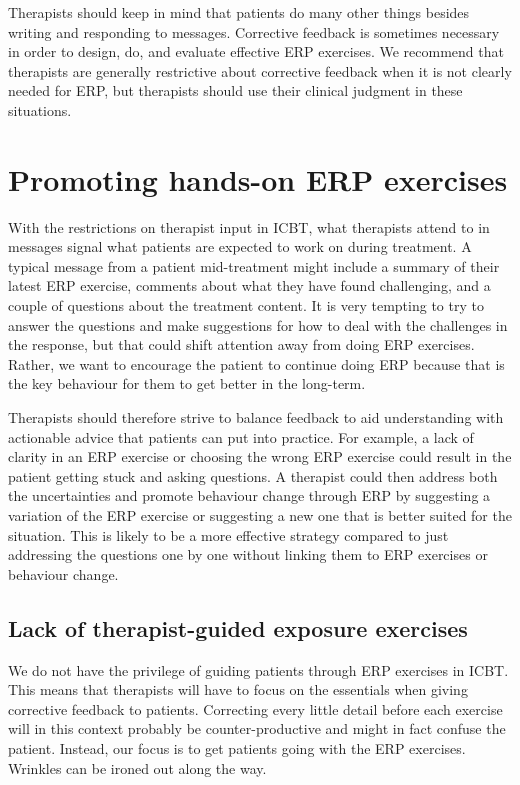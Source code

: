 \documentclass[]{book}
\theoremstyle{definition}
\theoremstyle{definition}
\theoremstyle{definition}
\theoremstyle{remark}
\begin{document}
Therapists should keep in mind that patients do many other things
besides writing and responding to messages. Corrective feedback is
sometimes necessary in order to design, do, and evaluate effective ERP
exercises. We recommend that therapists are generally restrictive about
corrective feedback when it is not clearly needed for ERP, but
therapists should use their clinical judgment in these situations.

\hypertarget{promoting-hands-on-erp-exercises}{%
\section{Promoting hands-on ERP
exercises}\label{promoting-hands-on-erp-exercises}}

With the restrictions on therapist input in ICBT, what therapists attend
to in messages signal what patients are expected to work on during
treatment. A typical message from a patient mid-treatment might include
a summary of their latest ERP exercise, comments about what they have
found challenging, and a couple of questions about the treatment
content. It is very tempting to try to answer the questions and make
suggestions for how to deal with the challenges in the response, but
that could shift attention away from doing ERP exercises. Rather, we
want to encourage the patient to continue doing ERP because that is the
key behaviour for them to get better in the long-term.

Therapists should therefore strive to balance feedback to aid
understanding with actionable advice that patients can put into
practice. For example, a lack of clarity in an ERP exercise or choosing
the wrong ERP exercise could result in the patient getting stuck and
asking questions. A therapist could then address both the uncertainties
and promote behaviour change through ERP by suggesting a variation of
the ERP exercise or suggesting a new one that is better suited for the
situation. This is likely to be a more effective strategy compared to
just addressing the questions one by one without linking them to ERP
exercises or behaviour change.

\hypertarget{lack-of-therapist-guided-exposure-exercises}{%
\subsection{Lack of therapist-guided exposure
exercises}\label{lack-of-therapist-guided-exposure-exercises}}

We do not have the privilege of guiding patients through ERP exercises
in ICBT. This means that therapists will have to focus on the essentials
when giving corrective feedback to patients. Correcting every little
detail before each exercise will in this context probably be
counter-productive and might in fact confuse the patient. Instead, our
focus is to get patients going with the ERP exercises. Wrinkles can be
ironed out along the way.
\end{document}
